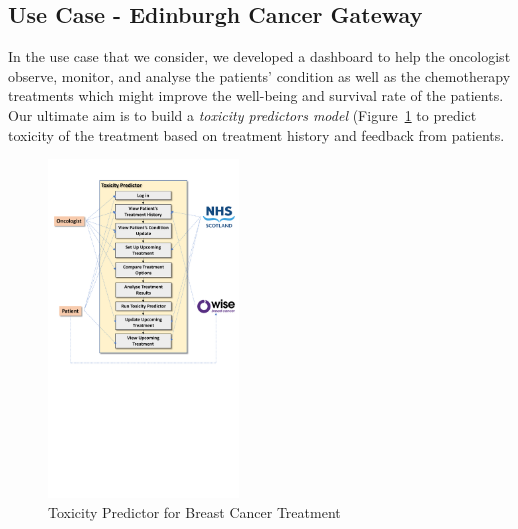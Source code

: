 \subsection{Use Case - Edinburgh Cancer Gateway}

\noindent
In the use case that we consider, we developed a dashboard to help the oncologist observe, monitor, and analyse the patients' condition as well as the chemotherapy treatments which might improve the well-being and survival rate of the patients. Our ultimate aim is to build a \emph{toxicity predictors model} (Figure~\ref{fig:USTANDiagram} to predict toxicity of the treatment based on treatment history and feedback from patients.

\begin{figure}[t!]
    \centering
    \includegraphics[width=0.45\textwidth]{images/USTANUseCaseDiagram.pdf}
    \caption{Toxicity Predictor for Breast Cancer Treatment}
    \label{fig:USTANDiagram}
\end{figure}

